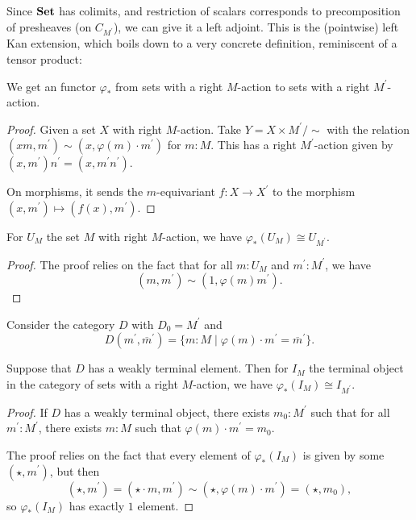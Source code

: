 Since $ \mathbf{Set} $ has colimits, and restriction of scalars corresponds to precomposition of presheaves (on $ C_{M^\prime} $), we can give it a left adjoint. This is the (pointwise) left Kan extension, which boils down to a very concrete definition, reminiscent of a tensor product:

\begin{lemma}\label{lem:scalar-extension}
  We get an  functor $ \varphi_* $ from sets with a right $ M $-action to sets with a right $ M^\prime $-action.
\end{lemma}
\begin{proof}
  Given a set $ X $ with right $ M $-action. Take $ Y = X \times M^\prime / \sim $ with the relation $ (x m, m^\prime) \sim (x, \varphi(m) \cdot m^\prime) $ for $ m: M $. This has a right $ M^\prime $-action given by $ (x, m^\prime)n^\prime = (x, m^\prime n^\prime) $.

  On morphisms, it sends the $ m $-equivariant $ f: X \to X^\prime $ to the morphism $ (x, m^\prime) \mapsto (f(x), m^\prime) $.
\end{proof}

\begin{lemma}\label{lem:scalar-extension-monoid-monoid-action}
  For $ U_M $ the set $ M $ with right $ M $-action, we have $ \varphi_*(U_M) \cong U_{M^\prime} $.
\end{lemma}
\begin{proof}
  The proof relies on the fact that for all $ m: U_M $ and $ m^\prime : M^\prime $, we have
  \[ (m, m^\prime) \sim (1, \varphi(m) m^\prime). \]
\end{proof}

Consider the category $ D $ with $ D_0 = M^\prime $ and
\[ D(m^\prime, \overline m^\prime) = \{ m: M \mid \varphi(m) \cdot m^\prime = \overline m^\prime \}. \]

\begin{lemma}\label{lem:scalar-extension-terminal}
  Suppose that $ D $ has a weakly terminal element. Then for $ I_M $ the terminal object in the category of sets with a right $ M $-action, we have $ \varphi_*(I_M) \cong I_{M^\prime} $.
\end{lemma}
\begin{proof}
  If $ D $ has a weakly terminal object, there exists $ m_0 : M^\prime $ such that for all $ m^\prime: M^\prime $, there exists $ m: M $ such that $ \varphi(m) \cdot m^\prime = m_0 $.

  The proof relies on the fact that every element of $ \varphi_*(I_M) $ is given by some $ (\star, m^\prime) $, but then
  \[ (\star, m^\prime) = (\star \cdot m, m^\prime) \sim (\star, \varphi(m) \cdot m^\prime) = (\star, m_0), \]
  so $ \varphi_*(I_M) $ has exactly $ 1 $ element.
\end{proof}

